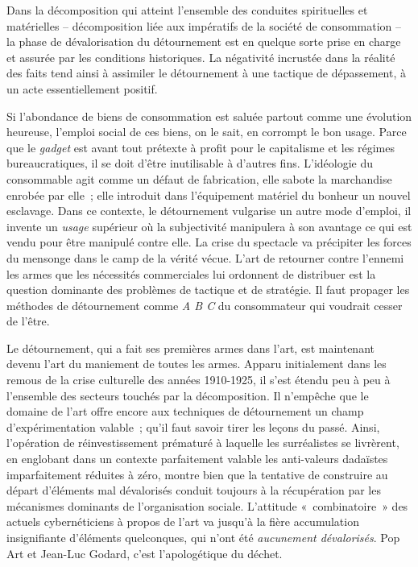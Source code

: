\documentclass[french,twoside]{book} %
\begin{document}
\noindent Dans la décomposition qui atteint l’ensemble des conduites spirituelles et matérielles – décomposition liée aux impératifs de la société de consommation – la phase de dévalorisation du détournement est en quelque sorte prise en charge et assurée par les conditions historiques. La négativité incrustée dans la réalité des faits tend ainsi à assimiler le détournement à une tactique de dépassement, à un acte essentiellement positif.\par
Si l’abondance de biens de consommation est saluée partout comme une évolution heureuse, l’emploi social de ces biens, on le sait, en corrompt le bon usage. Parce que le \emph{gadget} est avant tout prétexte à profit pour le capitalisme et les régimes bureaucratiques, il se doit d’être inutilisable à d’autres fins. L’idéologie du consommable agit comme un défaut de fabrication, elle sabote la marchandise enrobée par elle ; elle introduit dans l’équipement matériel du bonheur un nouvel esclavage. Dans ce contexte, le détournement vulgarise un autre mode d’emploi, il invente un \emph{usage} supérieur où la subjectivité manipulera à son avantage ce qui est vendu pour être manipulé contre elle. La crise du spectacle va précipiter les forces du mensonge dans le camp de la vérité vécue. L’art de retourner contre l’ennemi les armes que les nécessités commerciales lui ordonnent de distribuer est la question dominante des problèmes de tactique et de stratégie. Il faut propager les méthodes de détournement comme \emph{A B C} du consommateur qui voudrait cesser de l’être.\par
Le détournement, qui a fait ses premières armes dans l’art, est maintenant devenu l’art du maniement de toutes les armes. Apparu initialement dans les remous de la crise culturelle des années 1910-1925, il s’est étendu peu à peu à l’ensemble des secteurs touchés par la décomposition. Il n’empêche que le domaine de l’art offre encore aux techniques de détournement un champ d’expérimentation valable ; qu’il faut savoir tirer les leçons du passé. Ainsi, l’opération de réinvestissement prématuré à laquelle les surréalistes se livrèrent, en englobant dans un contexte parfaitement valable les anti-valeurs dadaïstes imparfaitement réduites à zéro, montre bien que la tentative de construire au départ d’éléments mal dévalorisés conduit toujours à la récupération par les mécanismes dominants de l’organisation sociale. L’attitude « combinatoire » des actuels cybernéticiens à propos de l’art va jusqu’à la fière accumulation insignifiante d’éléments quelconques, qui n’ont été \emph{aucunement dévalorisés}. Pop Art et Jean-Luc Godard, c’est l’apologétique du déchet.\par
\end{document}
